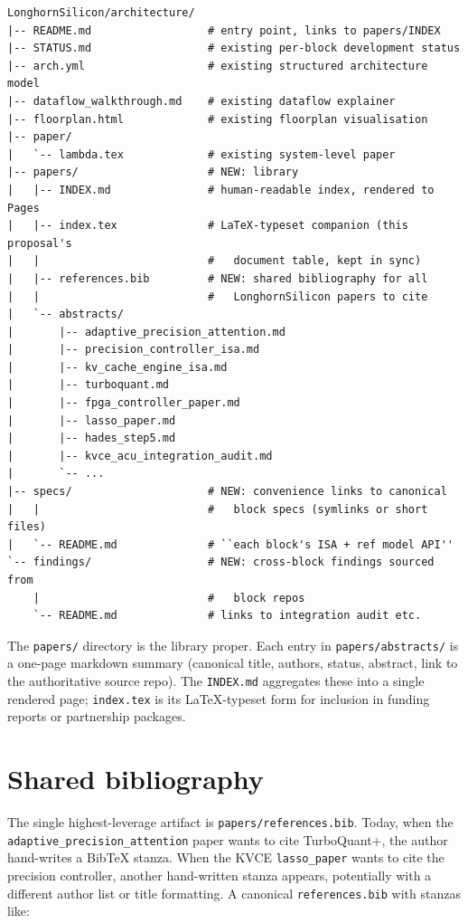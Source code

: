 \documentclass[11pt]{article}
\begin{document}
\begin{verbatim}
LonghornSilicon/architecture/
|-- README.md                  # entry point, links to papers/INDEX
|-- STATUS.md                  # existing per-block development status
|-- arch.yml                   # existing structured architecture model
|-- dataflow_walkthrough.md    # existing dataflow explainer
|-- floorplan.html             # existing floorplan visualisation
|-- paper/
|   `-- lambda.tex             # existing system-level paper
|-- papers/                    # NEW: library
|   |-- INDEX.md               # human-readable index, rendered to Pages
|   |-- index.tex              # LaTeX-typeset companion (this proposal's
|   |                          #   document table, kept in sync)
|   |-- references.bib         # NEW: shared bibliography for all
|   |                          #   LonghornSilicon papers to cite
|   `-- abstracts/
|       |-- adaptive_precision_attention.md
|       |-- precision_controller_isa.md
|       |-- kv_cache_engine_isa.md
|       |-- turboquant.md
|       |-- fpga_controller_paper.md
|       |-- lasso_paper.md
|       |-- hades_step5.md
|       |-- kvce_acu_integration_audit.md
|       `-- ...
|-- specs/                     # NEW: convenience links to canonical
|   |                          #   block specs (symlinks or short files)
|   `-- README.md              # ``each block's ISA + ref model API''
`-- findings/                  # NEW: cross-block findings sourced from
    |                          #   block repos
    `-- README.md              # links to integration audit etc.
\end{verbatim}

The \texttt{papers/} directory is the library proper. Each entry
in \texttt{papers/abstracts/} is a one-page markdown summary
(canonical title, authors, status, abstract, link to the
authoritative source repo). The \texttt{INDEX.md} aggregates these
into a single rendered page; \texttt{index.tex} is its LaTeX-typeset
form for inclusion in funding reports or partnership packages.

\section{Shared bibliography}

The single highest-leverage artifact is
\texttt{papers/references.bib}. Today, when the
\texttt{adaptive\_precision\_attention} paper wants to cite
TurboQuant+, the author hand-writes a BibTeX stanza. When the
KVCE \texttt{lasso\_paper} wants to cite the precision controller,
another hand-written stanza appears, potentially with a different
author list or title formatting. A canonical
\texttt{references.bib} with stanzas like:
\end{document}
